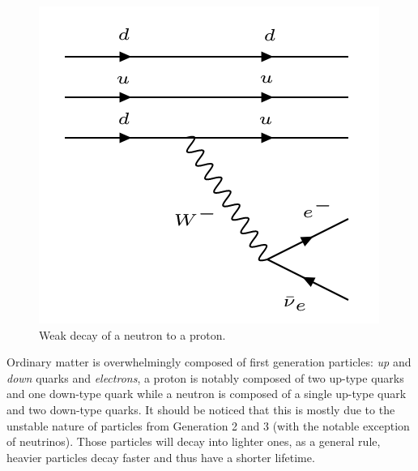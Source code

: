 \begin{figure}[htbp]
\centering
\includegraphics[width=0.5\linewidth]{./fig/betadecay.png}
\caption{Weak decay of a neutron to a proton.}
\label{fig:betadecay}
\end{figure}

Ordinary matter is overwhelmingly composed of first generation particles: \textit{up} and \textit{down} quarks and \textit{electrons}, a proton is notably composed of two up-type quarks and one down-type quark while a neutron is composed of a single up-type quark and two down-type quarks. It should be noticed that this is mostly due to the unstable nature of particles from Generation 2 and 3 (with the notable exception of neutrinos). Those particles will decay into lighter ones, as a general rule, heavier particles decay faster and thus have a shorter lifetime. 

